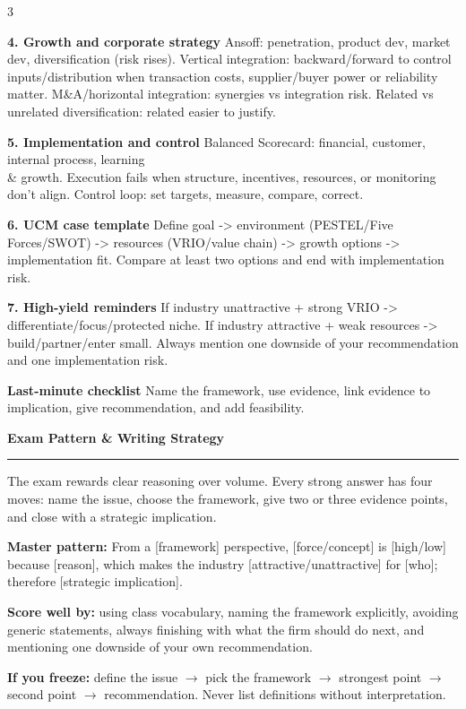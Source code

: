\documentclass[7.6pt,letterpaper]{article}
\newcommand{\secbar}[1]{%
    \vspace{2pt}\noindent\textbf{#1}\par\vspace{1pt}\hrule\vspace{2pt}%
  }
\newcommand{\secbar}[1]{%
    \vspace{3pt}%
    \noindent\colorbox{navy}{\parbox{\dimexpr\linewidth-2\fboxsep}{%
      \fontsize{6.8pt}{8pt}\sffamily\bfseries\color{white}\strut\ #1\strut}}%
    \vspace{1pt}\par%
  }
\newcommand{\T}[1]{\textbf{\color{navy}#1}}
\begin{document}
\begin{multicols}{3}
{\par
\textbf{4. Growth and corporate strategy}
Ansoff: penetration, product dev, market dev, diversification (risk rises). Vertical integration: backward/forward to control inputs/distribution when transaction costs, supplier/buyer power or reliability matter. M&A/horizontal integration: synergies vs integration risk. Related vs unrelated diversification: related easier to justify.
\par
\textbf{5. Implementation and control}
Balanced Scorecard: financial, customer, internal process, learning \\& growth. Execution fails when structure, incentives, resources, or monitoring don't align. Control loop: set targets, measure, compare, correct.
\par
\textbf{6. UCM case template}
Define goal -> environment (PESTEL/Five Forces/SWOT) -> resources (VRIO/value chain) -> growth options -> implementation fit. Compare at least two options and end with implementation risk.
\par
\textbf{7. High-yield reminders}
If industry unattractive + strong VRIO -> differentiate/focus/protected niche. If industry attractive + weak resources -> build/partner/enter small. Always mention one downside of your recommendation and one implementation risk.
\par
\textbf{Last-minute checklist}
Name the framework, use evidence, link evidence to implication, give recommendation, and add feasibility.
}


\secbar{Exam Pattern \& Writing Strategy}

The exam rewards clear reasoning over volume. Every strong answer has four moves: name the issue, choose the framework, give two or three evidence points, and close with a strategic implication.

\T{Master pattern:} From a [framework] perspective, [force/concept] is [high/low] because [reason], which makes the industry [attractive/unattractive] for [who]; therefore [strategic implication].

\T{Score well by:} using class vocabulary, naming the framework explicitly, avoiding generic statements, always finishing with what the firm should do next, and mentioning one downside of your own recommendation.

\T{If you freeze:} define the issue $\to$ pick the framework $\to$ strongest point $\to$ second point $\to$ recommendation. Never list definitions without interpretation.


\end{multicols}
\end{document}
